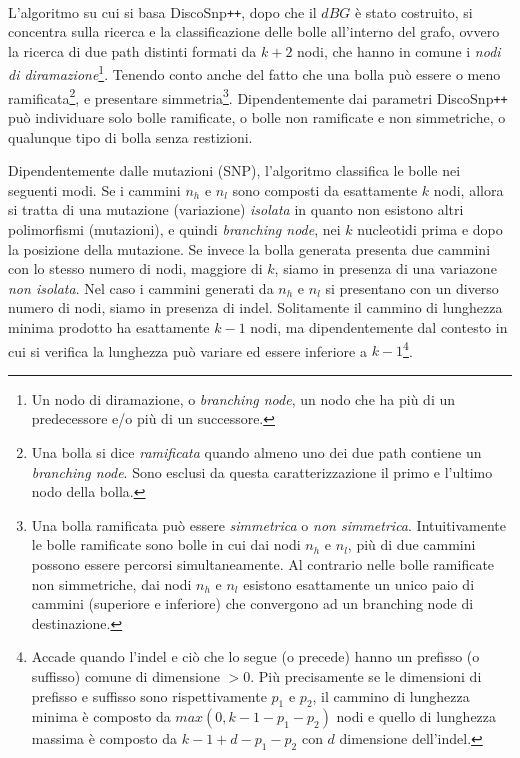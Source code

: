 \documentclass[../main.tex]{subfiles}
\begin{document}
\paragraph{}
L'algoritmo su cui si basa DiscoSnp\texttt{++}, dopo che il $dBG$ è stato costruito, si concentra sulla ricerca e la classificazione delle bolle all'interno del grafo, ovvero la ricerca di due path distinti formati da $k+2$ nodi, che hanno in comune i \textit{nodi di diramazione}\footnote{Un nodo di diramazione, o \textit{branching node}, un nodo che ha più di un predecessore e/o più di un successore.}. Tenendo conto anche del fatto che una bolla può essere o meno ramificata\footnote{Una bolla si dice \textit{ramificata} quando almeno uno dei due path contiene un \textit{branching node}. Sono esclusi da questa caratterizzazione il primo e l'ultimo nodo della bolla.}, e presentare simmetria\footnote{Una bolla ramificata può essere \textit{simmetrica} o \textit{non simmetrica}. Intuitivamente le bolle ramificate sono bolle in cui dai nodi $n_h$ e $n_l$, più di due cammini possono essere percorsi simultaneamente. Al contrario nelle bolle ramificate non simmetriche, dai nodi $n_h$ e $n_l$ esistono esattamente un unico paio di cammini (superiore e inferiore) che convergono ad un branching node di destinazione.}. Dipendentemente dai parametri DiscoSnp\texttt{++} può individuare solo bolle ramificate, o bolle non ramificate e non simmetriche, o qualunque tipo di bolla senza restizioni.

Dipendentemente dalle mutazioni (SNP), l'algoritmo classifica le bolle nei seguenti modi. Se i cammini $n_h$ e $n_l$ sono composti da esattamente $k$ nodi, allora si tratta di una mutazione (variazione) \textit{isolata} in quanto non esistono altri polimorfismi (mutazioni), e quindi \textit{branching node}, nei $k$ nucleotidi prima e dopo la posizione della mutazione. Se invece la bolla generata presenta due cammini con lo stesso numero di nodi, maggiore di $k$, siamo in presenza di una variazone \textit{non isolata}. Nel caso i cammini generati da $n_h$ e $n_l$ si presentano con un diverso numero di nodi, siamo in presenza di indel. Solitamente il cammino di lunghezza minima prodotto ha esattamente $k-1$ nodi, ma dipendentemente dal contesto in cui si verifica la lunghezza può variare ed essere inferiore a $k-1$\footnote{Accade quando l'indel e ciò che lo segue (o precede) hanno un prefisso (o suffisso) comune di dimensione $> 0$. Più precisamente se le dimensioni di prefisso e suffisso sono rispettivamente $p_1$ e $p_2$, il cammino di lunghezza minima è composto da $max(0, k-1-p_1 - p_2)$ nodi e quello di lunghezza massima è composto da $k-1+d-p_1 - p_2$ con $d$ dimensione dell'indel.}.
\end{document}
